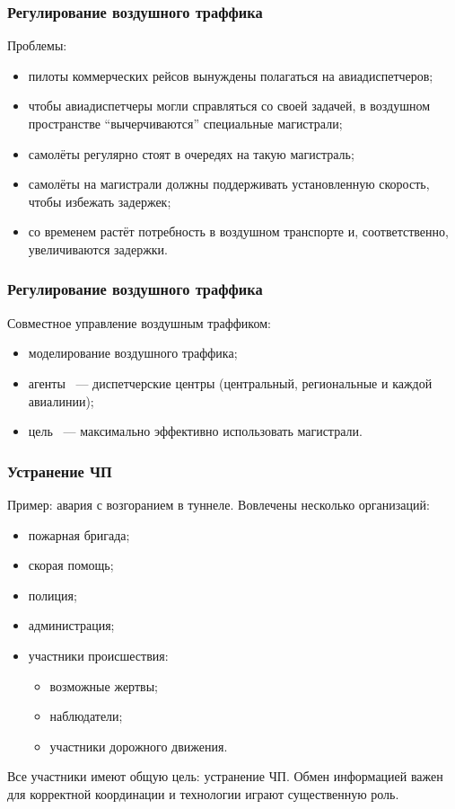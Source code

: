 \documentclass{beamer}
\begin{document}
\begin{frame}
  \frametitle{Регулирование воздушного траффика}
  Проблемы:
  \begin{itemize}
    \item пилоты коммерческих рейсов вынуждены полагаться на авиадиспетчеров;
    \item чтобы авиадиспетчеры могли справляться со своей задачей, в воздушном
      пространстве ``вычерчиваются'' специальные магистрали;
    \item самолёты регулярно стоят в очередях на такую магистраль;
    \item самолёты на магистрали должны поддерживать установленную скорость,
      чтобы избежать задержек;
    \item со временем растёт потребность в воздушном транспорте и, соответственно,
      увеличиваются задержки.
  \end{itemize}
\end{frame}

\begin{frame}
  \frametitle{Регулирование воздушного траффика}
  Совместное управление воздушным траффиком:
  \begin{itemize}
    \item моделирование воздушного траффика;
    \item агенты ~--- диспетчерские центры (центральный, региональные и каждой авиалинии);
    \item цель ~--- максимально эффективно использовать магистрали.
  \end{itemize}
\end{frame}

\begin{frame}
  \frametitle{Устранение ЧП}
  Пример: авария с возгоранием в туннеле. Вовлечены несколько организаций:
  \begin{itemize}
    \item пожарная бригада;
    \item скорая помощь;
    \item полиция;
    \item администрация;
    \item участники происшествия:
      \begin{itemize}
        \item возможные жертвы;
        \item наблюдатели;
        \item участники дорожного движения.
      \end{itemize}
  \end{itemize}

  Все участники имеют общую цель: устранение ЧП. Обмен информацией важен для корректной
  координации и технологии играют существенную роль.
\end{frame}
\end{document}
